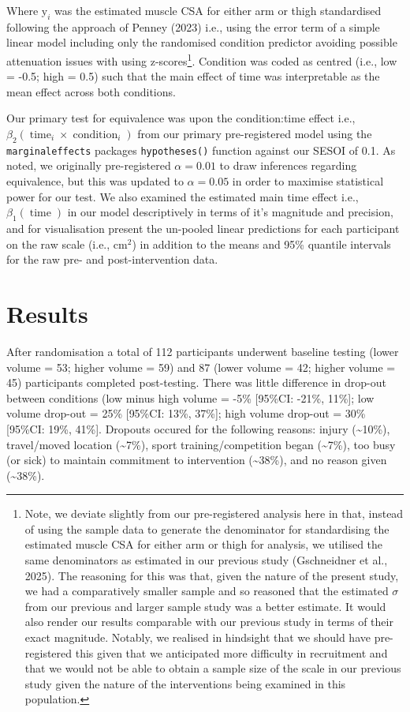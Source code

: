 \documentclass[
]{article}
\begin{document}
Where \(\textrm{y}_{i}\) was the estimated muscle CSA for either arm or
thigh standardised following the approach of Penney (2023) i.e., using
the error term of a simple linear model including only the randomised
condition predictor avoiding possible attenuation issues with using
z-scores\footnote{Note, we deviate slightly from our pre-registered
  analysis here in that, instead of using the sample data to generate
  the denominator for standardising the estimated muscle CSA for either
  arm or thigh for analysis, we utilised the same denominators as
  estimated in our previous study (Gschneidner et al., 2025). The
  reasoning for this was that, given the nature of the present study, we
  had a comparatively smaller sample and so reasoned that the estimated
  \(\sigma\) from our previous and larger sample study was a better
  estimate. It would also render our results comparable with our
  previous study in terms of their exact magnitude. Notably, we realised
  in hindsight that we should have pre-registered this given that we
  anticipated more difficulty in recruitment and that we would not be
  able to obtain a sample size of the scale in our previous study given
  the nature of the interventions being examined in this population.}.
Condition was coded as centred (i.e., low = -0.5; high = 0.5) such that
the main effect of time was interpretable as the mean effect across both
conditions.

Our primary test for equivalence was upon the condition:time effect
i.e.,
\(\beta_{2}(\operatorname{time}_i \times \operatorname{condition}_i)\)
from our primary pre-registered model using the \texttt{marginaleffects}
packages \texttt{hypotheses()} function against our SESOI of 0.1. As
noted, we originally pre-registered \(\alpha=0.01\) to draw inferences
regarding equivalence, but this was updated to \(\alpha=0.05\) in order
to maximise statistical power for our test. We also examined the
estimated main time effect i.e., \(\beta_{1}(\operatorname{time})\) in
our model descriptively in terms of it's magnitude and precision, and
for visualisation present the un-pooled linear predictions for each
participant on the raw scale (i.e., cm\(^2\)) in addition to the means
and 95\% quantile intervals for the raw pre- and post-intervention data.

\section{Results}\label{results}

After randomisation a total of 112 participants underwent baseline
testing (lower volume = 53; higher volume = 59) and 87 (lower volume =
42; higher volume = 45) participants completed post-testing. There was
little difference in drop-out between conditions (low minus high volume
= -5\% {[}95\%CI: -21\%, 11\%{]}; low volume drop-out = 25\% {[}95\%CI:
13\%, 37\%{]}; high volume drop-out = 30\% {[}95\%CI: 19\%, 41\%{]}.
Dropouts occured for the following reasons: injury
(\textasciitilde10\%), travel/moved location (\textasciitilde7\%), sport
training/competition began (\textasciitilde7\%), too busy (or sick) to
maintain commitment to intervention (\textasciitilde38\%), and no reason
given (\textasciitilde38\%).
\end{document}
